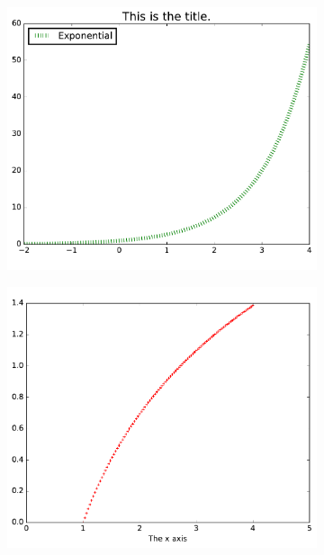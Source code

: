 \begin{figure}[H] %
\captionsetup[subfigure]{justification=centering}
\centering
\begin{subfigure}{.49\textwidth}
    \centering
    \includegraphics[width=\linewidth]{figures/custom1.pdf}
    \label{fig:custom1}
\end{subfigure}
%
\begin{subfigure}{.49\textwidth}
    \centering
    \includegraphics[width=\linewidth]{figures/custom2.pdf}
    \label{fig:custom2}
\end{subfigure}
\label{fig:custom}
\end{figure}

